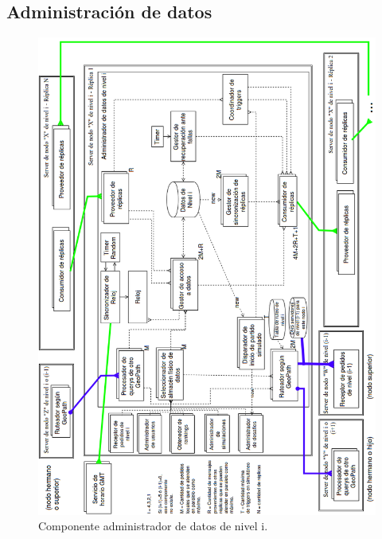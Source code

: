 \newpage

\subsection{Administración de datos} \label{seccionAdmDatos}

\begin{figure}[H]
   \centering
   \includegraphics[height=0.93\textheight]{reentrega/imagenes/admDatos.png}
   \caption{Componente administrador de datos de nivel i.}
\end{figure}

